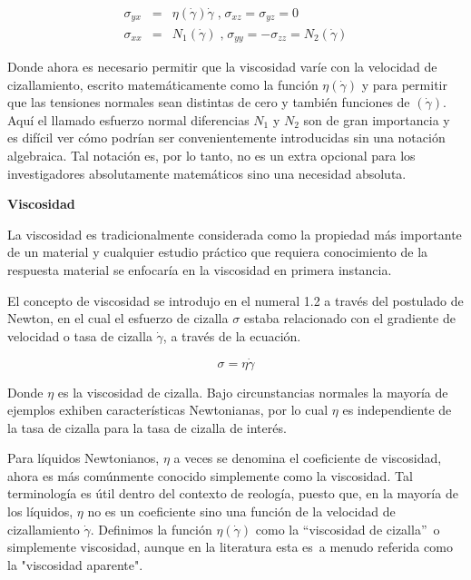 \documentclass[review]{elsarticle}
\begin{document}
\begin{eqnarray}\sigma _{y x} &  = & \eta  (\dot{\gamma }) \dot{\gamma }\;\text{,}\;\sigma _{x z} =\sigma _{y z} =0 \label{BE1.7} \\
\sigma _{x x} &  = & N_{1} (\dot{\gamma })\;\text{,}\;\sigma _{y y} = -\sigma _{z z} =N_{2} (\dot{\gamma }) \nonumber \end{eqnarray}

Donde ahora es necesario permitir que la viscosidad var\'ie con la velocidad de cizallamiento,
escrito matem\'aticamente como la funci\'on $\eta  \left (\dot{\gamma }\right )$ y para permitir que las tensiones normales sean distintas de cero y tambi\'en funciones de $\left (\dot{\gamma }\right )$. Aqu\'i el llamado esfuerzo normal diferencias $N_{1}$ y $N_{2}$ son de gran importancia y es dif\'icil ver c\'omo podr\'ian ser convenientemente introducidas sin una notaci\'on algebraica.
Tal notaci\'on es, por lo tanto, no es un extra opcional para los investigadores absolutamente matem\'aticos sino una necesidad absoluta.

\textbf{Viscosidad}

La viscosidad es tradicionalmente considerada como la propiedad m\'as importante de un material
y cualquier estudio pr\'actico que requiera conocimiento de la respuesta material se enfocar\'ia en la viscosidad en primera instancia.

El concepto de viscosidad se introdujo en el numeral 1.2 a trav\'es del postulado de Newton, en el cual el esfuerzo de cizalla $\sigma $ estaba relacionado con el gradiente de velocidad o tasa de cizalla $\dot{\gamma }$, a trav\'es de la ecuaci\'on.

\begin{equation}\sigma  =\eta  \dot{\gamma } \label{BE2.1}
\end{equation}\qquad \qquad \qquad \qquad \qquad \qquad \qquad \qquad \qquad \qquad

Donde $\eta $ es la viscosidad de cizalla. Bajo circunstancias normales la mayor\'ia de ejemplos exhiben caracter\'isticas Newtonianas,
por lo cual $\eta $ es independiente de la tasa de cizalla para la tasa de cizalla de inter\'es.

Para l\'iquidos
Newtonianos, $\eta $ a veces se denomina el coeficiente de viscosidad, ahora es m\'as com\'unmente conocido simplemente como la viscosidad.
Tal terminolog\'ia es \'util dentro del contexto de reolog\'ia, puesto que, en la mayor\'ia de los l\'iquidos, $\eta $ no es un coeficiente sino una funci\'on de la velocidad de cizallamiento $\dot{\gamma }$. Definimos la funci\'on $\eta  \left (\dot{\gamma }\right )$ como la ``viscosidad de cizalla''\ o simplemente viscosidad, aunque en la literatura
esta es\ a menudo referida como la "viscosidad aparente".
\end{document}
